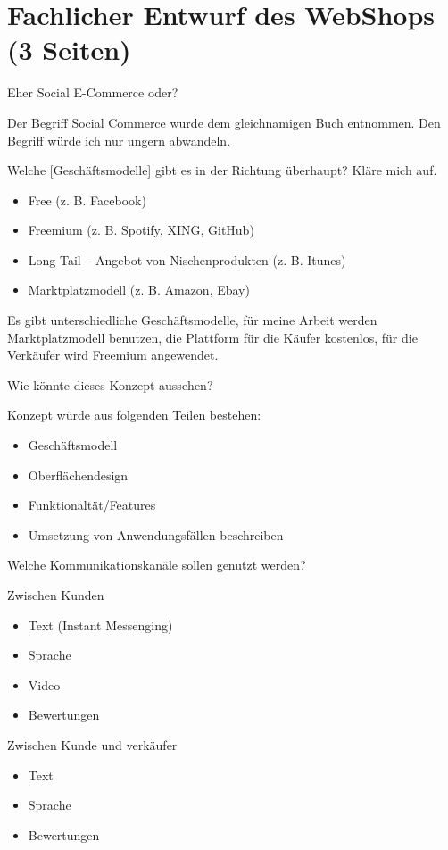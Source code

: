 
\chapter{Fachlicher Entwurf des WebShops (3 Seiten)}

Eher Social E-Commerce oder?

Der Begriff Social Commerce wurde dem gleichnamigen Buch \parencite{turban:sc} entnommen. Den Begriff würde ich nur ungern abwandeln. 

Welche [Geschäftsmodelle] gibt es in der Richtung überhaupt? Kläre mich auf. 

\begin{itemize}
\item Free (z. B. Facebook)
\item Freemium (z. B. Spotify, XING, GitHub)
\item Long Tail – Angebot von Nischenprodukten (z. B. Itunes)
\item Marktplatzmodell (z. B. Amazon, Ebay)
\end{itemize}

Es gibt unterschiedliche Geschäftsmodelle, für meine Arbeit werden Marktplatzmodell benutzen, die Plattform für die Käufer kostenlos, für die Verkäufer wird Freemium angewendet.

Wie könnte dieses Konzept aussehen? 

Konzept würde aus folgenden Teilen bestehen: 
\begin{itemize}
\item Geschäftsmodell 
\item Oberflächendesign 
\item Funktionaltät/Features 
\item Umsetzung von Anwendungsfällen beschreiben 
\end{itemize}

Welche Kommunikationskanäle sollen genutzt werden? 

Zwischen Kunden

\begin{itemize}
\item Text (Instant Messenging) 
\item Sprache 
\item Video 
\item Bewertungen 
\end{itemize}

Zwischen Kunde und verkäufer 

\begin{itemize}
\item Text 
\item Sprache 
\item Bewertungen 
\end{itemize}

